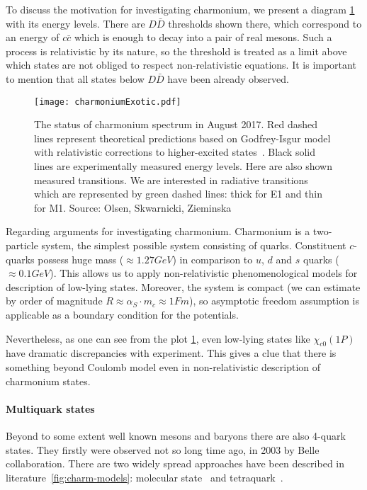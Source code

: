 To discuss the motivation for investigating charmonium, we present a diagram \cref{fig:charm-states} with its energy levels. There are $D\bar{D}$ thresholds shown there, which correspond to an energy of $c \bar{c}$ which is enough to decay into a pair of real mesons. Such a process is relativistic by its nature, so the threshold is treated as a limit above which states are not obliged to respect non-relativistic equations. It is important to mention that all states below $D\bar{D}$ have been already observed.

\begin{figure}[H]
    \centering
    \texttt{[image: charmoniumExotic.pdf]}
    \caption{The status of charmonium spectrum in August 2017. Red dashed lines represent theoretical predictions based on Godfrey-Isgur model with relativistic corrections to higher-excited states~\cite{gbs-model}. Black solid lines are experimentally measured energy levels. Here are also shown measured transitions. We are interested in radiative transitions which are represented by green dashed lines: thick for E1 and thin for M1. Source: Olsen, Skwarnicki, Zieminska~\cite{heavy-quark_pics}} \label{fig:charm-states}
\end{figure}

Regarding arguments for investigating charmonium. Charmonium is a two-particle system, the simplest possible system consisting of quarks. Constituent $c$-quarks possess huge mass ($\approx 1.27 GeV$) in comparison to $u$, $d$ and $s$ quarks ($\approx 0.1 GeV$). This allows us to apply non-relativistic phenomenological models for description of low-lying states. Moreover, the system is compact (we can estimate by order of magnitude $R \approx \alpha_S \cdot m_c \approx 1 Fm$), so asymptotic freedom assumption is applicable as a boundary condition for the potentials.\cite{charm-slides}

Nevertheless, as one can see from the plot \cref{fig:charm-states}, even low-lying states like $\chi_{c0}(1P)$ have dramatic discrepancies with experiment. This gives a clue that there is something beyond Coulomb model even in non-relativistic description of charmonium states.

\paragraph{Multiquark states}
Beyond to some extent well known mesons and baryons there are also 4-quark states. They firstly were observed not so long time ago, in 2003 by Belle collaboration. There are two widely spread approaches have been described in literature~\cref{fig:charm-models}: molecular state~\cite{molecular-model} and tetraquark~\cite{tetraquark-model}.

